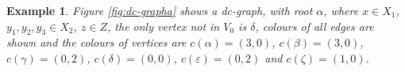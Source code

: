 \documentclass[a4paper,12pt]{article}
\def\d{\delta }
\def\b{\beta }
\def\z{\zeta }
\def\e{\varepsilon }
\def\g{\gamma }
\def\a{\alpha }
\newtheorem{exam}[theorem]{Example}
\newenvironment{example}{\begin{exam} \rm}{\end{exam}}
\numberwithin{equation}{section}
\numberwithin{figure}{section}
\begin{document}
\begin{example}\label{ex:dc-graph}
Figure \ref{fig:dc-grapha} shows a dc-graph, with root $\a$, 
where $x\in X_1$, $y_1,y_2,y_3\in X_2$,
$z\in Z$, the only vertex not in $V_0$ is $\d$, 
colours of all edges are shown and the colours of vertices  are 
$c(\a)=(3,0)$, $c(\b)=(3,0)$, $c(\g)=(0,2)$, $c(\d)=(0,0)$, $c(\e)=(0,2)$ and 
$c(\z)=(1,0)$.  
\end{example}
\begin{figure}
\begin{center}
\psfrag{a}{$\a$}
\psfrag{b}{$\b$}
\psfrag{c}{$\g$}
\psfrag{d}{$\d$}
\psfrag{e}{$\e$}
\psfrag{f}{$\z$}
\hspace{15mm}
\end{center}
\end{figure}
\end{document}
